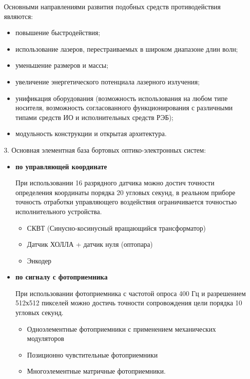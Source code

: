 Основными направлениями развития подобных средств противодействия являются:
\begin{itemize}
	\item повышение быстродействия;
	\item использование лазеров, перестраиваемых в широком диапазоне длин волн;
	\item уменьшение размеров и массы;
	\item увеличение энергетического потенциала лазерного излучения;
	\item унификация оборудования (возможность использования на любом типе носителя, возможность согласованного функционирования с различными типами средств ИО и исполнительных средств РЭБ);
	\item модульность конструкции и открытая архитектура.
\end{itemize}

3. Основная элементная база бортовых оптико-электронных систем:
\begin{itemize}
	\item \textbf{по управляющей координате}
	
	При использовании 16 разрядного датчика можно достич точности определения координаты порядка 20 угловых секунд, в реальном приборе точность отработки управляющего воздействия ограничивается точностью исполнительного устройства.
	
	\begin{itemize}
		\item СКВТ (Синусно-косинусный вращающийся трансформатор)
		\item Датчик ХОЛЛА + датчик нуля (оптопара)
		\item Энкодер
	\end{itemize}
		
	\item \textbf{по сигналу с фотоприемника} 
	
	При использовании фотоприемника с частотой опроса 400 Гц и разрешением 512х512 пикселей можно достичь точности сопровождения цели порядка 10 угловых секунд.
	
	\begin{itemize}
		\item Одноэлементные фотоприемники с применением механических модуляторов
		\item Позиционно чувстительные фотоприемники		
		\item Многоэлементные матричные фотоприемники.	
	\end{itemize}
	
	
\end{itemize}

